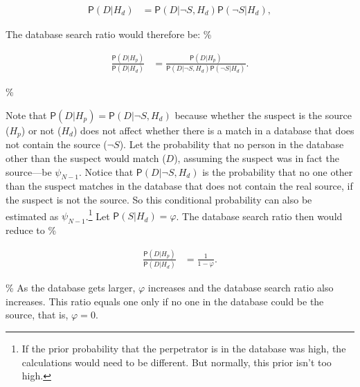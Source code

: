 \documentclass[10pt,dvipsnames,enabledeprecatedfontcommands]{scrartcl}
\newcommand{\pr}[1]{\mathsf{P}(#1)}
\begin{document}
\begin{align*}
\pr{D\vert H_d} & =  \pr{D\vert \neg S, H_d} \pr{\neg S \vert H_d}, 
\end{align*}

The database search ratio would therefore be: \%

\begin{align*}
\frac{\pr{D\vert H_p}}{\pr{D\vert H_d}} & = \frac{\pr{D\vert H_p}}{\pr{D\vert \neg S, H_d} \pr{\neg S \vert H_d}}.
\end{align*}

\%

Note that \(\pr{D\vert H_p}=\pr{D\vert \neg S, H_d}\) because whether
the suspect is the source (\(H_p\)) or not (\(H_d\)) does not affect
whether there is a match in a database that does not contain the source
(\(\neg S\)). Let the probability that no person in the database other
than the suspect would match (\(D\)), assuming the suspect was in fact
the source---be \(\psi_{N-1}\). Notice that \(\pr{D\vert \neg S, H_d}\)
is the probability that no one other than the suspect matches in the
database that does not contain the real source, if the suspect is not
the source. So this conditional probability can also be estimated as
\(\psi_{N-1}\).\footnote{If the prior probability that the perpetrator is in the database was high, the calculations would need to be different. But normally, this prior isn't too high.}
Let \(\pr{S | H_d}=\varphi\). The database search ratio then would
reduce to \%

\begin{align*}
\frac{\pr{D\vert H_p}}{\pr{D\vert H_d}} & = \frac{1}{1-\varphi}.
\end{align*}

\% As the database gets larger, \(\varphi\) increases and the database
search ratio also increases. This ratio equals one only if no one in the
database could be the source, that is, \(\varphi=0\).
\end{document}
